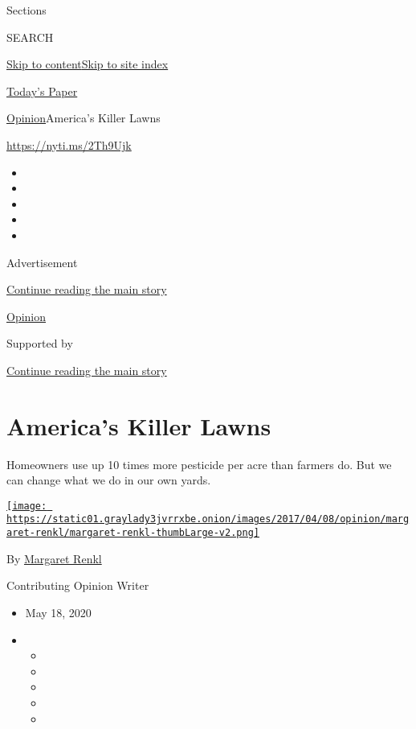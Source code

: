 Sections

SEARCH

\protect\hyperlink{site-content}{Skip to
content}\protect\hyperlink{site-index}{Skip to site index}

\href{https://myaccount.nytimes3xbfgragh.onion/auth/login?response_type=cookie\&client_id=vi}{}

\href{https://www.nytimes3xbfgragh.onion/section/todayspaper}{Today's
Paper}

\href{/section/opinion}{Opinion}\textbar{}America's Killer Lawns

\url{https://nyti.ms/2Th9Ujk}

\begin{itemize}
\item
\item
\item
\item
\item
\end{itemize}

Advertisement

\protect\hyperlink{after-top}{Continue reading the main story}

\href{/section/opinion}{Opinion}

Supported by

\protect\hyperlink{after-sponsor}{Continue reading the main story}

\hypertarget{americas-killer-lawns}{%
\section{America's Killer Lawns}\label{americas-killer-lawns}}

Homeowners use up 10 times more pesticide per acre than farmers do. But
we can change what we do in our own yards.

\href{https://www.nytimes3xbfgragh.onion/by/margaret-renkl}{\texttt{[image: https://static01.graylady3jvrrxbe.onion/images/2017/04/08/opinion/margaret-renkl/margaret-renkl-thumbLarge-v2.png]}}

By \href{https://www.nytimes3xbfgragh.onion/by/margaret-renkl}{Margaret
Renkl}

Contributing Opinion Writer

\begin{itemize}
\item
  May 18, 2020
\item
  \begin{itemize}
  \item
  \item
  \item
  \item
  \item
  \end{itemize}
\end{itemize}

